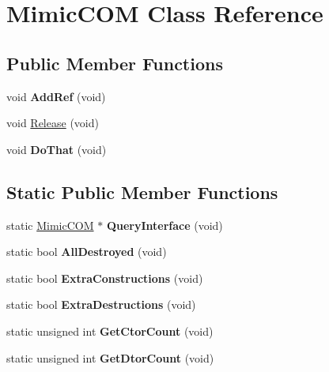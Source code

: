 \hypertarget{classMimicCOM}{}\section{Mimic\+C\+O\+M Class Reference}
\label{classMimicCOM}
\subsection*{Public Member Functions}
\begin{DoxyCompactItemize}
\item 
\hypertarget{classMimicCOM_a4c7ca036eeb2de99008bd5013d89a569}{}void {\bfseries Add\+Ref} (void)\label{classMimicCOM_a4c7ca036eeb2de99008bd5013d89a569}

\item 
void \hyperlink{classMimicCOM_a8d5debd60d3d566f4fa9dcf8ec128254}{Release} (void)
\item 
\hypertarget{classMimicCOM_ae74427645676a9d677c87d1a9e2474d8}{}void {\bfseries Do\+That} (void)\label{classMimicCOM_ae74427645676a9d677c87d1a9e2474d8}

\end{DoxyCompactItemize}
\subsection*{Static Public Member Functions}
\begin{DoxyCompactItemize}
\item 
\hypertarget{classMimicCOM_a3effb0170ab4de176a205500ff330c18}{}static \hyperlink{classMimicCOM}{Mimic\+C\+O\+M} $\ast$ {\bfseries Query\+Interface} (void)\label{classMimicCOM_a3effb0170ab4de176a205500ff330c18}

\item 
\hypertarget{classMimicCOM_a99fd754132deca72963089ecd50a5563}{}static bool {\bfseries All\+Destroyed} (void)\label{classMimicCOM_a99fd754132deca72963089ecd50a5563}

\item 
\hypertarget{classMimicCOM_a104b1db9d030f52df9f7f7d10450385b}{}static bool {\bfseries Extra\+Constructions} (void)\label{classMimicCOM_a104b1db9d030f52df9f7f7d10450385b}

\item 
\hypertarget{classMimicCOM_a8ded38c0aba925b237c41be7c389938a}{}static bool {\bfseries Extra\+Destructions} (void)\label{classMimicCOM_a8ded38c0aba925b237c41be7c389938a}

\item 
\hypertarget{classMimicCOM_aaf6a8c814b37427193358f848c79e3c3}{}static unsigned int {\bfseries Get\+Ctor\+Count} (void)\label{classMimicCOM_aaf6a8c814b37427193358f848c79e3c3}

\item 
\hypertarget{classMimicCOM_ac1d11be01f5b571ff59d1ead29111f7a}{}static unsigned int {\bfseries Get\+Dtor\+Count} (void)\label{classMimicCOM_ac1d11be01f5b571ff59d1ead29111f7a}

\end{DoxyCompactItemize}


